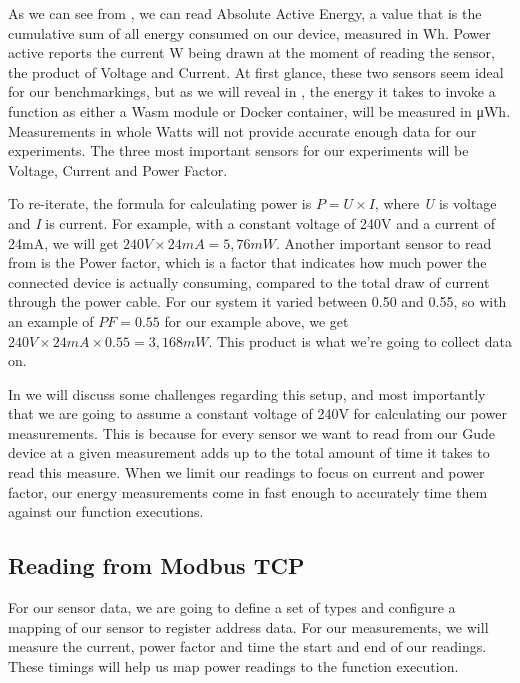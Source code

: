 \documentclass[
  table]{report}
\begin{document}
As we can see from , we can read Absolute Active
Energy, a value that is the cumulative sum of all energy consumed on our
device, measured in Wh. Power active reports the current W being drawn
at the moment of reading the sensor, the product of Voltage and Current.
At first glance, these two sensors seem ideal for our benchmarkings, but
as we will reveal in , the energy it takes to invoke
a function as either a \ac{Wasm} module or Docker container, will be
measured in μWh. Measurements in whole Watts will not provide accurate
enough data for our experiments. The three most important sensors for
our experiments will be Voltage, Current and Power Factor.

To re-iterate, the formula for calculating power is \(P = U \times I\),
where \emph{U} is voltage and \emph{I} is current. For example, with a
constant voltage of 240V and a current of 24mA, we will get
\(240V \times 24mA = 5,76mW\). Another important sensor to read from is
the Power factor, which is a factor that indicates how much power the
connected device is actually consuming, compared to the total draw of
current through the power cable. For our system it varied between 0.50
and 0.55, so with an example of \(PF = 0.55\) for our example above, we
get \(240V \times 24mA \times 0.55 = 3,168mW\). This product is what
we're going to collect data on.

In  we will discuss some challenges
regarding this setup, and most importantly that we are going to assume a
constant voltage of 240V for calculating our power measurements. This is
because for every sensor we want to read from our Gude device at a given
measurement adds up to the total amount of time it takes to read this
measure. When we limit our readings to focus on current and power
factor, our energy measurements come in fast enough to accurately time
them against our function executions.

\subsection{Reading from Modbus TCP}

For our sensor data, we are going to define a set of types and configure
a mapping of our sensor to register address data. For our measurements,
we will measure the current, power factor and time the start and end of
our readings. These timings will help us map power readings to the
function execution.

\inputminted[firstline = 33, lastline = 60]{rust}{assets/code/modbus.rs}
\end{document}
